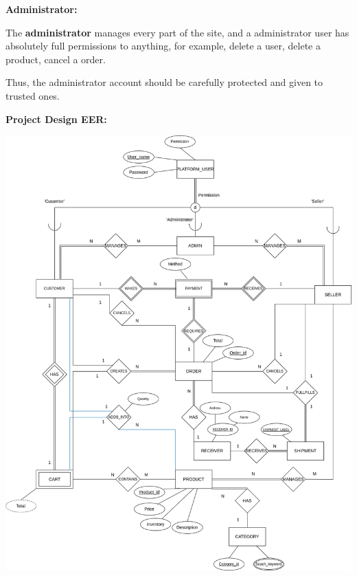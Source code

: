 \documentclass[12pt]{article}
\begin{document}
\vspace*{5mm}
\textbf{Administrator:}

    The \textbf{administrator} manages every part of the site, and a administrator user has absolutely full permissions to anything, for example, delete 
    a user, delete a product, cancel a order.

    Thus, the administrator account should be carefully protected and given to trusted ones.




\newpage 
\textbf{Project Design EER:}

\includegraphics[height=.80\textheight]{Diagrams/onlineShopping_revised.png}
\end{document}
